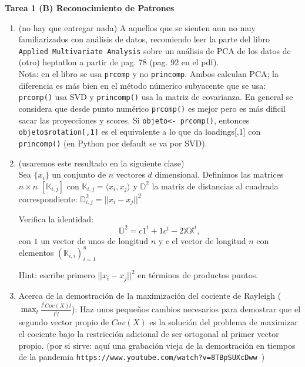 \documentclass[12pt]{book}
\newcommand {\?}{?`}
\newcommand{\D}{\mathbb{D}}
\newcommand{\K}{\mathbb{K}}
\newcommand{\X}{\mathbb{X}}
\begin{document}
\specialaccent \mbox{} 
\begin{center}
{\Large \bf Tarea 1 (B) Reconocimiento de Patrones} \mbox{} \vspace{0.5cm} \\
\end{center}




\begin{enumerate}

\item (no hay que entregar nada) A aquellos que se sienten aun no muy familiarizados con an\'alisis de datos,
recomiendo leer la parte del libro {\tt Applied Multivariate Analysis}  sobre  un an\'alisis de PCA de los datos de (otro) heptatlon  a partir de pag. 78 (pag.  92 en el pdf). \\
Nota: en el libro se usa {\tt prcomp} y no {\tt princomp}. Ambos calculan PCA; la diferencia es m\'as bien en el m\'etodo n\'umerico subyacente que se usa:  {\tt prcomp()} usa SVD y {\tt princomp()} usa la matriz de covarianza.
En general se considera  que desde punto num\'erico {\tt prcomp()} es mejor pero es m\'as dificil sacar las proyecciones y scores. Si \verb|objeto<- prcomp()|, entonces  \verb|objeto$rotation[,1]|  es el equivalente a lo que da loadings[,1] con  {\tt princomp()} (en Python por default se va por SVD).




\item (usaremos  este resultado en la siguiente clase)\\
Sea $\{x_i\}$ un conjunto de $n$ vectores $d$ dimensional.  Definimos las matrices  $n \times n$  $[\K_{i,j}]$ con $\K_{i,j}= \langle x_i, x_j \rangle$ y $\D^2$ la matriz de distancias al cuadrada correspondiente: $\D^2_{i,j}=||x_i-x_j||^2$

Verifica la identidad:
\[ \D^2 = c 1^t + 1 c^t -2 \X\X^t , \]
con $1$ un vector de unos de longitud $n$ y $c$ el vector de longitud $n$ con elementos $( \K_{i,i})_{i=1}^n$

Hint: escribe primero $||x_i-x_j||^2$   en t\'erminos de productos puntos.

\item
Acerca de la demostraci\'on de la maximizaci\'on del cociente de Rayleigh ($\max_l \frac{l^tCov(X)l}{l^t l}$):
Haz unos peque\~nos cambios necesarios para demostrar que el segundo vector propio de $Cov(X)$ es la soluci\'on del problema de maximizar el cociente bajo la restricci\'on adicional de ser ortogonal al primer vector propio.  
(por si sirve: aqu\'i una grabaci\'on vieja de la demostraci\'on en tiempos de la pandemia {\tt https://www.youtube.com/watch?v=8TBpSUXcDww })





\end{enumerate}
\end{document}
